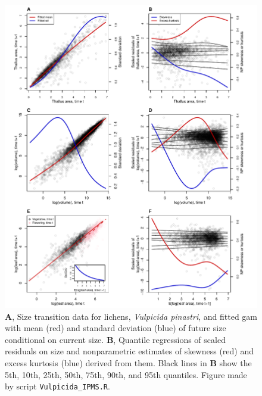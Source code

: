 \documentclass[12pt]{article}
\begin{document}
\begin{figure}[tbp]
	\centering
	\includegraphics[width=1.0\textwidth]{figures/combo_resid_diagnostics.pdf}
	\caption{\textbf{A}, Size transition data for lichens, \emph{Vulpicida pinastri}, and fitted gam with mean (red) and standard deviation (blue) of future size conditional on current size.  \textbf{B}, Quantile regressions of scaled residuals on size and nonparametric estimates of skewness (red) and excess kurtosis (blue) derived from them. Black lines in \textbf{B} show the 5th, 10th, 25th, 50th, 75th, 90th, and 95th quantiles. Figure made by script \texttt{Vulpicida\_IPMS.R}.}
	\label{fig:resid_diagnostics}
\end{figure}
\end{document}
